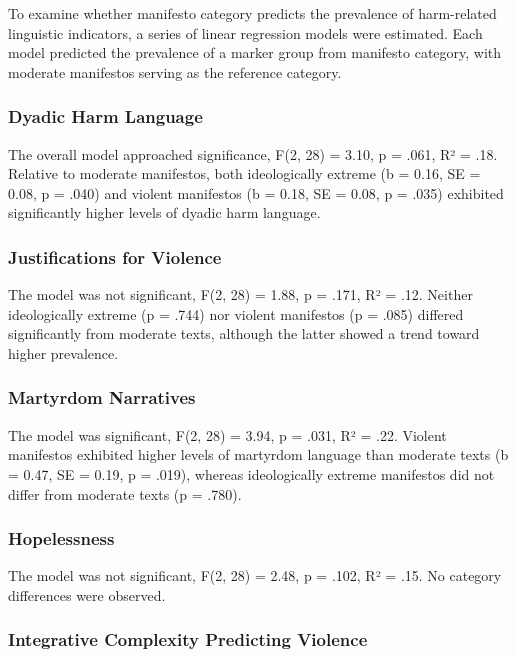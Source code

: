 \documentclass[
  english,
  man,floatsintext]{apa6}
\begin{document}
To examine whether manifesto category predicts the prevalence of harm-related linguistic indicators, a series of linear regression models were estimated. Each model predicted the prevalence of a marker group from manifesto category, with moderate manifestos serving as the reference category.

\subsubsection{Dyadic Harm Language}\label{dyadic-harm-language}

The overall model approached significance, F(2, 28) = 3.10, p = .061, R² = .18. Relative to moderate manifestos, both ideologically extreme (b = 0.16, SE = 0.08, p = .040) and violent manifestos (b = 0.18, SE = 0.08, p = .035) exhibited significantly higher levels of dyadic harm language.

\subsubsection{Justifications for Violence}\label{justifications-for-violence}

The model was not significant, F(2, 28) = 1.88, p = .171, R² = .12. Neither ideologically extreme (p = .744) nor violent manifestos (p = .085) differed significantly from moderate texts, although the latter showed a trend toward higher prevalence.

\subsubsection{Martyrdom Narratives}\label{martyrdom-narratives}

The model was significant, F(2, 28) = 3.94, p = .031, R² = .22. Violent manifestos exhibited higher levels of martyrdom language than moderate texts (b = 0.47, SE = 0.19, p = .019), whereas ideologically extreme manifestos did not differ from moderate texts (p = .780).

\subsubsection{Hopelessness}\label{hopelessness}

The model was not significant, F(2, 28) = 2.48, p = .102, R² = .15. No category differences were observed.

\subsubsection{Integrative Complexity Predicting Violence}\label{integrative-complexity-predicting-violence}
\end{document}

